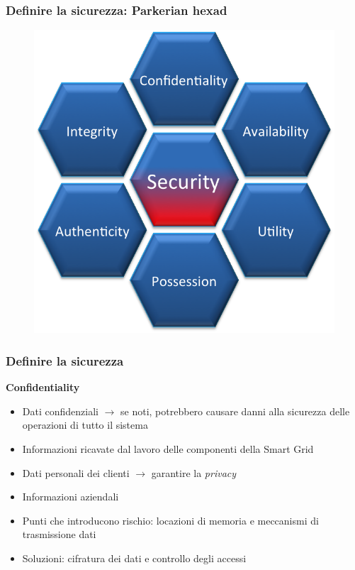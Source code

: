 \begin{frame}
  \frametitle{Definire la sicurezza: Parkerian hexad}
  	\begin{figure}[h] 
		\includegraphics[scale=0.4]{imgs/hexad.png}
	\end{figure}
\end{frame}

\begin{frame}
  \frametitle{Definire la sicurezza}
  \textbf{Confidentiality}
  	\begin{itemize}[<+- | alert@+>]
  		\item Dati confidenziali $\rightarrow$ se noti, potrebbero causare danni alla sicurezza delle operazioni di tutto il sistema
  		\item Informazioni ricavate dal lavoro delle componenti della Smart Grid
  		\item Dati personali dei clienti $\rightarrow$ garantire la \textit{privacy}
  		\item Informazioni aziendali
  		\item Punti che introducono rischio: locazioni di memoria e meccanismi di trasmissione dati
  		\item Soluzioni: cifratura dei dati e controllo degli accessi
  	\end{itemize}
\end{frame}

